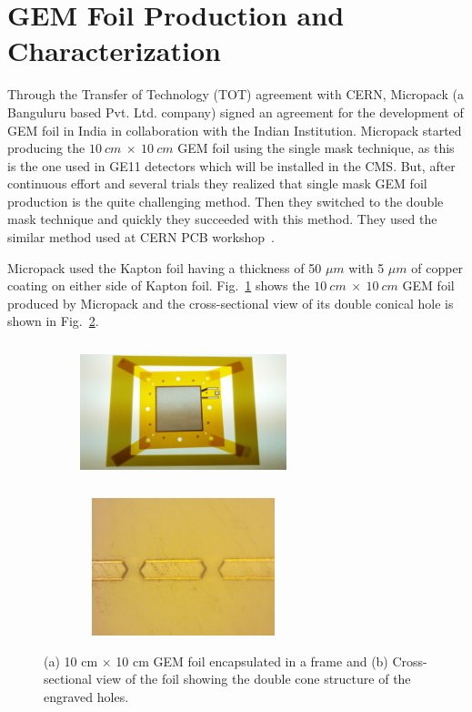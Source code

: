 
\section{GEM Foil Production and Characterization} %
\label{sec:gem_foil_production_and_characterization}
Through the Transfer of Technology (TOT) agreement with CERN, Micropack (a Banguluru based Pvt. Ltd. company) signed an agreement for the development of GEM foil in India in collaboration with the Indian Institution.
Micropack started producing the $10~cm~\times~10~cm$ GEM foil using the single mask technique, as this is the one used in GE11 detectors which will be installed in the CMS.
But, after continuous effort and several trials they realized that single mask GEM foil production is the quite challenging method.
Then they switched to the double mask technique and quickly they succeeded with this method. 
They used the similar method used at CERN PCB workshop~\cite{DEOLIVEIRA2009}. 

Micropack used the Kapton foil having a thickness of 50 $\mu m$ with 5 $\mu m$ of copper coating on either side of Kapton foil. Fig.~\ref{fig:Foil_and_Cone_a} shows the $10~cm~\times~10~cm$ GEM foil produced by Micropack and the cross-sectional view of its double conical hole is shown in Fig.~\ref{fig:Foil_and_Cone_b}.
\begin{figure}[!htbp]
    \centering
    \begin{subfigure}[b]{0.46\textwidth}
        \includegraphics[width=6cm, height=4cm]{figures/GEM/figures/Foil_01.png}\qquad
        \caption{ }
        \label{fig:Foil_and_Cone_a}
    \end{subfigure}
    \begin{subfigure}[b]{0.46\textwidth}
        \includegraphics[width=6cm, height=4cm]{figures/GEM/figures/double_cone.png}
        \caption{ }
        \label{fig:Foil_and_Cone_b}
    \end{subfigure}
   \caption{(a) 10 cm $\times$ 10 cm GEM foil encapsulated in a frame and (b) Cross-sectional view of the foil showing the double cone structure of the engraved holes. } \label{fig:Foil_and_Cone}
\end{figure}

